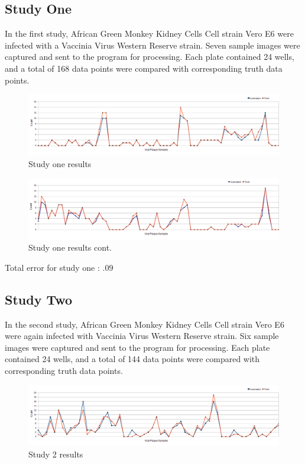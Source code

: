 \documentclass[11pt,final,twocolumn]{IEEEtran}
\begin{document}
\subsection{Study One}
In the first study, African Green Monkey Kidney Cells  Cell strain Vero E6 were infected with a Vaccinia Virus Western Reserve strain. Seven sample images were captured and sent to the program for processing. Each plate contained 24 wells, and a total of 168 data points were compared with corresponding truth data points.

\begin{figure}[H]
\centering
\includegraphics[width=.5\textwidth]{Study1Results.png}
\caption{Study one results}
\label{fig:study1Results}
\end{figure}

\begin{figure}[H]
\centering
\includegraphics[width=.5\textwidth]{Study1ResultsCont.png}
\caption{Study one results cont.}
\label{fig:study1ResultsCont}
\end{figure}

Total error for study one : $.09$ 


\subsection{Study Two}
In the second study, African Green Monkey Kidney Cells  Cell strain Vero E6 were again infected with Vaccinia Virus Western Reserve strain. Six sample images were captured and sent to the program for processing. Each plate contained 24 wells, and a total of 144 data points were compared with corresponding truth data points.

\begin{figure}[H]
\centering
\includegraphics[width=.5\textwidth]{Study2Results.png}
\caption{Study 2 results}
\label{fig:study2Results}
\end{figure}
\end{document}
